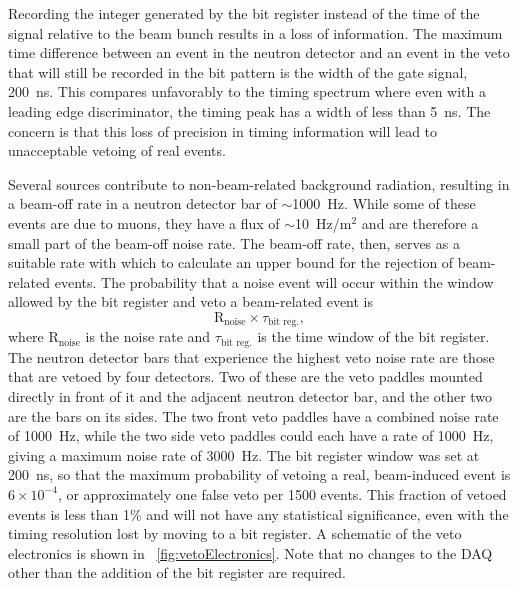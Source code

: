 Recording the integer generated by the bit register instead of the time of the signal relative to the beam bunch results in a loss of information.  The maximum time difference between an event in the neutron detector and an event in the veto that will still be recorded in the bit pattern is the width of the gate signal, 200~ns.  This compares unfavorably to the timing spectrum where even with a leading edge discriminator, the timing peak has a width of less than 5~ns.  The concern is that this loss of precision in timing information will lead to unacceptable vetoing of real events.  

Several sources contribute to non-beam-related background radiation, resulting in a beam-off rate in a neutron detector bar of $\sim$1000~Hz.  While some of these events are due to muons, they have a flux of $\sim$10~Hz/m$^2$ and are therefore a small part of the beam-off noise rate.  The beam-off rate, then, serves as a suitable rate with which to calculate an upper bound for the rejection of beam-related events.  The probability that a noise event will occur within the window allowed by the bit register and veto a beam-related event is
\begin{equation}
\text{R}_{\text{noise}}\times\tau_{\text{bit reg.}},
\end{equation}
where $\text{R}_{\text{noise}}$ is the noise rate and $\tau_{\text{bit reg.}}$ is the time window of the bit register.  The neutron detector bars that experience the highest veto noise rate are those that are vetoed by four detectors.  Two of these are the veto paddles mounted directly in front of it and the adjacent neutron detector bar, and the other two are the bars on its sides.  The two front veto paddles have a combined noise rate of 1000~Hz, while the two side veto paddles could each have a rate of 1000~Hz, giving a maximum noise rate of 3000~Hz.   The bit register window was set at 200~ns, so that the maximum probability of vetoing a real, beam-induced event is $6\times10^{-4}$, or approximately one false veto per 1500 events.  This fraction of vetoed events is less than 1\% and will not have any statistical significance, even with the timing resolution lost by moving to a bit register.  A schematic of the veto electronics is shown in {\fig}~\ref{fig:vetoElectronics}.  Note that no changes to the DAQ other than the addition of the bit register are required.

